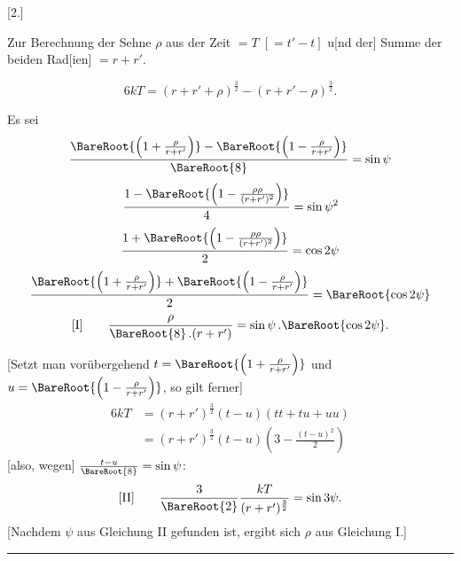 \clearpage
{}
\begin{center}
[2.]\par
\medskip
Zur Berechnung der Sehne \(\rho\) aus der Zeit \(=T\;[=t'-t]\) u[nd der] Summe der beiden Rad[ien] \(=r+r'\).
\end{center}
\[
6kT=(r+r'+\rho)^{\frac{3}{2}}-(r+r'-\rho)^{\frac{3}{2}}.
\]

Es sei
\[
\frac{\BareRoot{\left(1+\frac{\rho}{r+r'}\right)}-\BareRoot{\left(1-\frac{\rho}{r+r'}\right)}}{\BareRoot{8}}=\sin\psi
\]
\[
\frac{1-\BareRoot{\left(1-\frac{\rho\rho}{(r+r')^2}\right)}}{4}=\sin\psi^2
\]
\[
\frac{1+\BareRoot{\left(1-\frac{\rho\rho}{(r+r')^2}\right)}}{2}=\cos2\psi
\]
\[
\frac{\BareRoot{\left(1+\frac{\rho}{r+r'}\right)}+\BareRoot{\left(1-\frac{\rho}{r+r'}\right)}}{2}=\BareRoot{\cos2\psi}
\]
\[
\mathrm{[I]}\qquad \frac{\rho}{\BareRoot{8}\,.(r+r')}=\sin\psi\,.\BareRoot{\cos2\psi}.
\]

[Setzt man vorübergehend \(t=\BareRoot{\left(1+\frac{\rho}{r+r'}\right)}\) und \(u=\BareRoot{\left(1-\frac{\rho}{r+r'}\right)}\), so gilt ferner]
\[
\begin{aligned}
6kT&=(r+r')^{\frac{3}{2}}(t-u)(tt+tu+uu)\\
&=(r+r')^{\frac{3}{2}}(t-u)\left(3-\frac{(t-u)^2}{2}\right)
\end{aligned}
\]
[also, wegen] \(\frac{t-u}{\BareRoot{8}}=\sin\psi\):
\[
\mathrm{[II]}\qquad \frac{3}{\BareRoot{2}}\frac{kT}{(r+r')^{\frac{3}{2}}}=\sin3\psi.
\]
[Nachdem \(\psi\) aus Gleichung II gefunden ist, ergibt sich \(\rho\) aus Gleichung I.]
\begin{center}\rule{.3\linewidth}{.4pt}\end{center}
